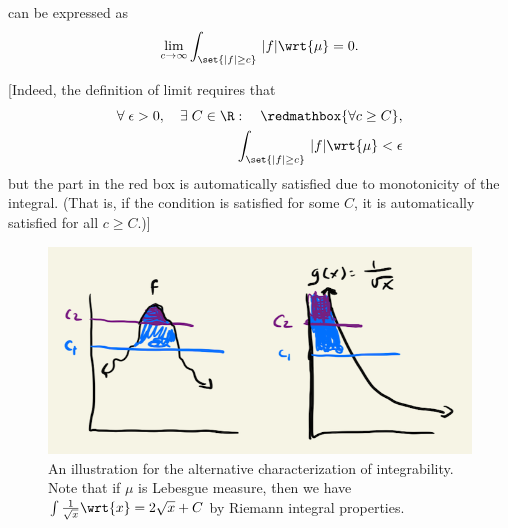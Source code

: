 \documentclass{article} %
\begin{document}
\begin{remark}
 can be expressed as 
\[ \lim_{c \to \infty} \int_{\set{|f| \geq c}} \, |f| \wrt{\mu} = 0.\]

\scriptsize{[Indeed, the definition of limit requires that 
\begin{align*}
\forall \; \epsilon >0, \quad  \exists \; C \in \R : \quad \redmathbox{\forall c \geq C}, \\
\int_{\set{|f| \geq c}} \, |f| \wrt{\mu} < \epsilon
\end{align*}
but the part in the red box is automatically satisfied due to monotonicity of the integral. (That is, if the condition is satisfied for some $C$, it is automatically satisfied for all $c \geq C$.)]}
\label{rk:characterization_of_integrability_as_vanishing_measure_of_upper_portion}
\end{remark}

\begin{figure}[H]
\centering
\includegraphics[width=.7\textwidth]{images/alt_characterization_of_integrability.png}	
\caption{An illustration for the alternative characterization of integrability.  Note that if $\mu$ is Lebesgue measure, then we have $\int \frac{1}{\sqrt{x}} \wrt{x} = 2 \sqrt{x} + C$ by Riemann integral properties.}
\label{fig:alt_characterization_of_integrability}
\end{figure}
\end{document}
